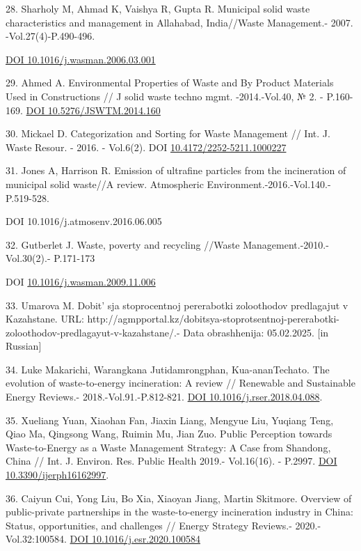 28. Sharholy M, Ahmad K, Vaishya R, Gupta R. Municipal solid waste
characteristics and management in Allahabad, India//Waste Management.-
2007. -Vol.27(4)-P.490-496.

\href{https://doi.org/10.1016/j.wasman.2006.03.001}{DOI
10.1016/j.wasman.2006.03.001}

29. Ahmed A. Environmental Properties of Waste and By Product Materials
Used in Constructions // J solid waste techno mgmt. -2014.-Vol.40, № 2.
- P.160-169. \href{https://doi.org/10.5276/JSWTM.2014.160}{DOI
10.5276/JSWTM.2014.160}

30. Mickael D. Categorization and Sorting for Waste Management // Int.
J. Waste Resour. - 2016. - Vol.6(2). DOI
\href{http://dx.doi.org/10.4172/2252-5211.1000227}{10.4172/2252-5211.1000227}

31. Jones A, Harrison R. Emission of ultrafine particles from the
incineration of municipal solid waste//A review. Atmospheric
Environment.-2016.-Vol.140.-P.519-528.

DOI 10.1016/j.atmosenv.2016.06.005

32. Gutberlet J. Waste, poverty and recycling //Waste
Management.-2010.-Vol.30(2).- P.171-173

DOI
\href{http://dx.doi.org/10.1016/j.wasman.2009.11.006}{10.1016/j.wasman.2009.11.006}

33. Umarova M. Dobit' sja stoprocentnoj pererabotki
zoloothodov predlagajut v Kazahstane. URL:
http://agmpportal.kz/dobitsya-stoprotsentnoj-pererabotki-zoloothodov-predlagayut-v-kazahstane/.-
Data obrashhenija: 05.02.2025. {[}in Russian{]}

34. Luke Makarichi, Warangkana Jutidamrongphan, Kua-ananTechato. The
evolution of waste-to-energy incineration: A review // Renewable and
Sustainable Energy Reviews.- 2018.-Vol.91.-P.812-821.
\href{https://doi.org/10.1016/j.rser.2018.04.088}{DOI
10.1016/j.rser.2018.04.088}.

35. Xueliang Yuan, Xiaohan Fan, Jiaxin Liang, Mengyue Liu, Yuqiang Teng,
Qiao Ma, Qingsong Wang, Ruimin Mu, Jian Zuo. Public Perception towards
Waste-to-Energy as a Waste Management Strategy: A Case from Shandong,
China // Int. J. Environ. Res. Public Health 2019.- Vol.16(16). -
P.2997. \href{https://doi.org/10.3390/ijerph16162997}{DOI
10.3390/ijerph16162997}.

36. Caiyun Cui, Yong Liu, Bo Xia, Xiaoyan Jiang, Martin Skitmore.
Overview of public-private partnerships in the waste-to-energy
incineration industry in China: Status, opportunities, and challenges //
Energy Strategy Reviews.- 2020.- Vol.32:100584.
\href{https://doi.org/\%20DOI\%2010.1016/j.esr.2020.100584}{DOI
10.1016/j.esr.2020.100584}

